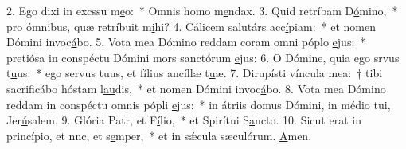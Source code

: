 2. Ego dixi in excssu m\uline{e}o:~* Omnis homo m\uline{e}ndax.
3. Quid retríbam D\uline{ó}mino,~* pro ómnibus, quæ retríbuit m\uline{i}hi?
4. Cálicem salutárs acc\uline{í}piam:~* et nomen Dómini invoc\uline{á}bo.
5. Vota mea Dómino reddam coram omni póplo \uline{e}jus:~* pretiósa in conspéctu Dómini mors sanctórum \uline{e}jus:
6. O Dómine, quia ego srvus t\uline{u}us:~* ego servus tuus, et fílius ancíllæ t\uline{u}æ.
7. Dirupísti víncula mea:~† tibi sacrificábo hóstam l\uline{au}dis,~* et nomen Dómini invoc\uline{á}bo.
8. Vota mea Dómino reddam in conspéctu omnis pópli \uline{e}jus:~* in átriis domus Dómini, in médio tui, Jer\uline{ú}salem.
9. Glória Patr, et F\uline{í}lio,~* et Spirítui S\uline{a}ncto.
10. Sicut erat in princípio, et nnc, et s\uline{e}mper,~* et in sǽcula sæculórum. \uline{A}men.
